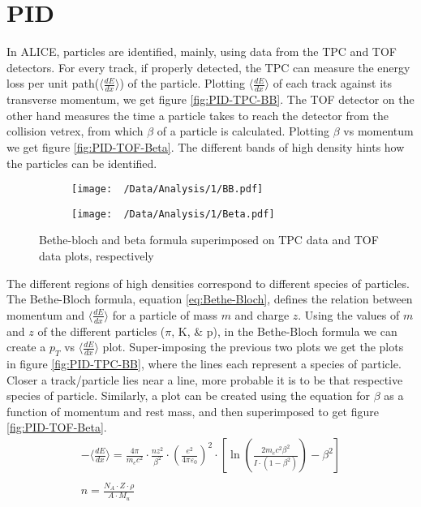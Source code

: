 \documentclass[12pt,a4paper,twoside]{report}
\begin{document}
\section{PID}
In ALICE, particles are identified, mainly, using data from the TPC and TOF detectors. For every track, if properly detected, the TPC can measure the energy loss per unit path($\langle{ \frac{dE}{dx}}\rangle$) of the particle. Plotting $\langle{ \frac{dE}{dx}}\rangle$ of each track against its transverse momentum, we get figure \ref{fig:PID-TPC-BB}. The TOF detector on the other hand measures the time a particle takes to reach the detector from the collision vetrex, from which $\beta$ of a particle is calculated. Plotting $\beta$ vs momentum we get figure \ref{fig:PID-TOF-Beta}. The different bands of high density hints how the particles can be identified.\\
\begin{figure}[H]
	\begin{subfigure}{0.49\linewidth}
		\texttt{[image: ~/Data/Analysis/1/BB.pdf]}
	\end{subfigure}
	\begin{subfigure}{0.49\linewidth}
		\texttt{[image: ~/Data/Analysis/1/Beta.pdf]}
	\end{subfigure}
	\caption{\label{fig:PID-TPC-TOF}Bethe-bloch and beta formula superimposed on TPC data and TOF data plots, respectively}
\end{figure}
The different regions of high densities correspond to different species of particles. The Bethe-Bloch formula, equation \ref{eq:Bethe-Bloch}, defines the relation between momentum and $\langle{ \frac{dE}{dx}}\rangle$ for a particle of mass $m$ and charge $z$. Using the values of $m$ and $z$ of the different particles ($\pi$, K, \& p), in the Bethe-Bloch formula we can create a $p_T$ vs $\langle{ \frac{dE}{dx}}\rangle$ plot. Super-imposing the previous two plots we get the plots in figure \ref{fig:PID-TPC-BB}, where the lines each represent a species of particle. Closer a track/particle lies near a line, more probable it is to be that respective species of particle. Similarly, a plot can be created using the equation for $\beta$ as a function of momentum and rest mass, and then superimposed to get figure \ref{fig:PID-TOF-Beta}.
\begin{align}\label{eq:Bethe-Bloch}
	-\langle\frac{dE}{dx}\rangle=\frac{4\pi}{m_{e}c^2}\cdot\frac{nz^2}{\beta^2}\cdot(\frac{e^2}{4\pi\varepsilon_0})^2\cdot[\ln(\frac{2m_ec^2\beta^2}{I\cdot(1-\beta^2)})-\beta^2]
	\\\nonumber\\\nonumber
	n=\frac{N_A\cdot Z\cdot\rho}{A\cdot M_u}
\end{align}
\end{document}
